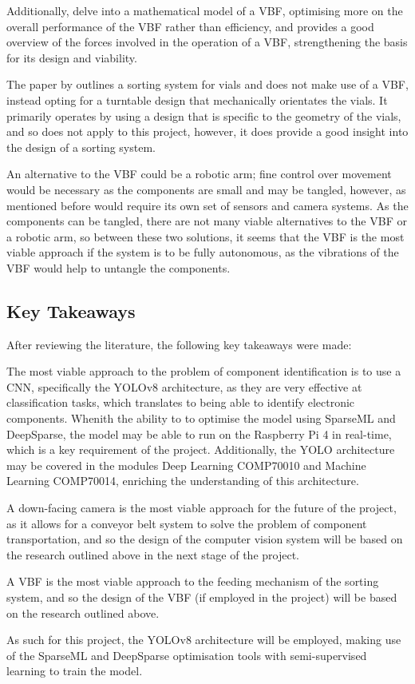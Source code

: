 Additionally, \citet{REINHART2010191} delve into a mathematical model of a VBF, optimising more on the overall performance of the VBF rather than efficiency, and \citet{ForceAnalysisofVibratoryBowlFeeder}
provides a good overview of the forces involved in the operation of a VBF, strengthening the basis for its design and viability.

The paper by \citet{zhang2019design} outlines a sorting system for vials and does not make use of a VBF, instead opting for a turntable design that mechanically orientates the vials. It primarily operates
by using a design that is specific to the geometry of the vials, and so does not apply to this project, however, it does provide a good insight into the design of a sorting system.

An alternative to the VBF could be a robotic arm; fine control over movement would be necessary as the components are small and may be tangled, however, as mentioned before would require its own set of sensors and camera systems.
As the components can be tangled, there are not many viable alternatives to the VBF or a robotic arm, so between these two solutions, it seems that the VBF is the most viable approach if the system is to be fully autonomous, as the vibrations of the VBF would help to untangle the components.
\subsection{Key Takeaways}
After reviewing the literature, the following key takeaways were made:

The most viable approach to the problem of component identification is to use a CNN, specifically the YOLOv8 architecture, as they are very effective at classification tasks, which translates to being able to identify electronic components. Whenith the ability to
to optimise the model using SparseML and DeepSparse, the model may be able to run on the Raspberry Pi 4 in real-time, which is a key requirement of the project.
Additionally, the YOLO architecture may be covered in the modules Deep Learning COMP70010 and Machine Learning COMP70014, enriching the understanding of this architecture.

A down-facing camera is the most viable approach for the future of the project, as it allows for a conveyor belt system to solve the problem of component transportation, and so the design of the computer vision system will be based on the research outlined above in the next stage of the project.

A VBF is the most viable approach to the feeding mechanism of the sorting system, and so the design of the VBF (if employed in the project) will be based on the research outlined above.

As such for this project, the YOLOv8 architecture will be employed, making use of the SparseML and DeepSparse optimisation tools with semi-supervised learning to train the model.
